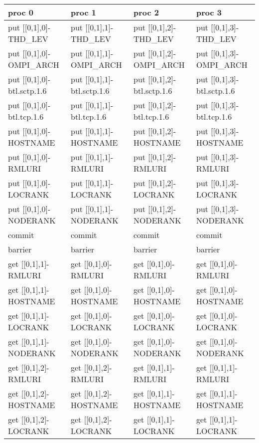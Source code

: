 \begin{table}
\centering
\begin{tabular}{|p{4cm}|p{4cm}|p{4cm}|p{4cm}|}\hline
\textbf{proc 0} &       \textbf{proc 1} &   \textbf{proc 2} &    \textbf{proc 3}\\
\hline
put [[0,1],0]-THD\_LEV
 & put [[0,1],1]-THD\_LEV
 & put [[0,1],2]-THD\_LEV
 & put [[0,1],3]-THD\_LEV\\
put [[0,1],0]-OMPI\_ARCH
 & put [[0,1],1]-OMPI\_ARCH
 & put [[0,1],2]-OMPI\_ARCH
 & put [[0,1],3]-OMPI\_ARCH\\
put [[0,1],0]-btl.sctp.1.6
 &  put [[0,1],1]-btl.sctp.1.6
 &  put [[0,1],2]-btl.sctp.1.6
 &  put [[0,1],3]-btl.sctp.1.6\\
put [[0,1],0]-btl.tcp.1.6
 &  put [[0,1],1]-btl.tcp.1.6
 &  put [[0,1],2]-btl.tcp.1.6
 &  put [[0,1],3]-btl.tcp.1.6\\
put [[0,1],0]-HOSTNAME
 &  put [[0,1],1]-HOSTNAME
 &  put [[0,1],2]-HOSTNAME
 &  put [[0,1],3]-HOSTNAME\\
put [[0,1],0]-RMLURI
 &  put [[0,1],1]-RMLURI
 &  put [[0,1],2]-RMLURI
 &  put [[0,1],3]-RMLURI\\
put [[0,1],0]-LOCRANK
 &  put [[0,1],1]-LOCRANK
 &  put [[0,1],2]-LOCRANK
 &  put [[0,1],3]-LOCRANK\\
put [[0,1],0]-NODERANK
 &  put [[0,1],1]-NODERANK
 &  put [[0,1],2]-NODERANK
 &  put [[0,1],3]-NODERANK\\
commit & commit & commit & commit \\  
barrier& barrier& barrier& barrier\\  
\hline
get [[0,1],1]-RMLURI
 &  get [[0,1],0]-RMLURI
 &  get [[0,1],0]-RMLURI
 &  get [[0,1],0]-RMLURI\\
get [[0,1],1]-HOSTNAME
 &  get [[0,1],0]-HOSTNAME
 &  get [[0,1],0]-HOSTNAME
 &  get [[0,1],0]-HOSTNAME\\
get [[0,1],1]-LOCRANK
 &  get [[0,1],0]-LOCRANK
 &  get [[0,1],0]-LOCRANK
 &  get [[0,1],0]-LOCRANK\\
get [[0,1],1]-NODERANK
 &  get [[0,1],0]-NODERANK
 &  get [[0,1],0]-NODERANK
 &  get [[0,1],0]-NODERANK\\
\hline
get [[0,1],2]-RMLURI
 &  get [[0,1],2]-RMLURI
 &  get [[0,1],1]-RMLURI
 &  get [[0,1],1]-RMLURI\\
get [[0,1],2]-HOSTNAME
 &  get [[0,1],2]-HOSTNAME
 &  get [[0,1],1]-HOSTNAME
 &  get [[0,1],1]-HOSTNAME\\
get [[0,1],2]-LOCRANK
 &  get [[0,1],2]-LOCRANK
 &  get [[0,1],1]-LOCRANK
 &  get [[0,1],1]-LOCRANK\\

\end{tabular}
\end{table}
